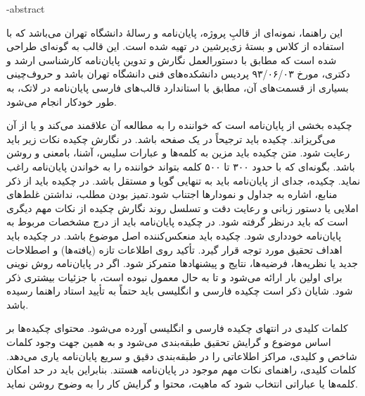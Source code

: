 \fa-abstract{
این راهنما، نمونه‌ای از قالبِ پروژه، پایان‌نامه و رسالهٔ دانشگاه تهران می‌باشد که با استفاده از کلاس 
و بستهٔ زی‌پرشین در \lr{\LaTeX}{} تهیه شده است. این قالب به گونه‌ای طراحی شده است که مطابق با دستورالعمل نگارش و تدوین پایان‌نامه کارشناسی ارشد و دکتری، مورخ ۹۳/۰۶/۰۳ پردیس دانشکده‌های فنی دانشگاه تهران باشد و حروف‌چینی بسیاری از قسمت‌های آن، مطابق با استاندارد قالب‌های فارسی پایان‌نامه در لاتک، به طور خودکار انجام می‌شود.

چکیده بخشی از پایان‌نامه است که خواننده را به مطالعه آن علاقمند می‌کند و یا از آن می‌گریزاند. چکیده باید ترجیحاً‌ در یک صفحه باشد. در نگارش چکیده نکات زیر باید رعایت شود. متن چکیده باید مزین به کلمه‌ها و عبارات سلیس، آشنا، بامعنی و روشن باشد. بگونه‌ای که با حدود ۳۰۰ تا ۵۰۰ کلمه بتواند خواننده را به خواندن پایان‌نامه راغب نماید. چکیده، جدای از پایان‌نامه باید به تنهایی گویا و مستقل باشد. در چکیده باید از ذکر منابع، اشاره به جداول و نمودارها اجتناب شود.تمیز بودن مطلب، نداشتن غلط‌های املایی یا دستور زبانی و رعایت دقت و تسلسل روند نگارش چکیده از نکات مهم دیگری است که باید درنظر گرفته شود. در چکیده پایان‌نامه باید از درج مشخصات مربوط به پایان‌نامه خودداری شود.
چکیده باید منعکس‌کننده اصل موضوع باشد. در چکیده باید اهداف تحقیق مورد توجه قرار گیرد. تأکید روی اطلاعات تازه (یافته‌ها) و اصطلاحات جدید یا نظریه‌ها، فرضیه‌ها، نتایج و پیشنهادها متمرکز شود. اگر در پایان‌نامه روش نوینی برای اولین بار ارائه می‌شود و تا به حال معمول نبوده است، با جزئیات بیشتری ذکر شود. شایان ذکر است چکیده فارسی و انگلیسی باید حتماً به تأیید استاد راهنما رسیده باشد.

کلمات کلیدی در انتهای چکیده فارسی و انگلیسی آورده می‌شود. محتوای چکیده‌ها بر اساس موضوع و گرایش تحقیق طبقه‌بندی می‌شود و به همین جهت وجود کلمات شاخص و کلیدی، مراکز اطلاعاتی  را در طبقه‌بندی دقیق و سریع پایان‌نامه یاری می‌دهد. کلمات کلیدی، راهنمای نکات مهم موجود در پایان‌نامه هستند. بنابراین باید در حد امکان کلمه‌ها یا عباراتی انتخاب شود که ماهیت، محتوا و گرایش کار را به وضوح روشن نماید.
}
